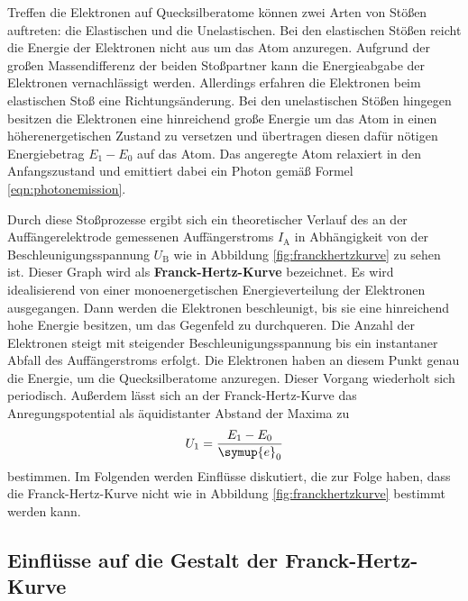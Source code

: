 Treffen die Elektronen auf Quecksilberatome können zwei Arten von Stößen auftreten: die 
Elastischen und die Unelastischen. Bei den elastischen Stößen reicht die Energie der Elektronen
nicht aus um das Atom anzuregen. Aufgrund der großen Massendifferenz der beiden Stoßpartner
kann die Energieabgabe der Elektronen vernachlässigt werden. Allerdings erfahren die Elektronen
beim elastischen Stoß eine Richtungsänderung.
Bei den unelastischen Stößen hingegen besitzen die Elektronen eine hinreichend große 
Energie um das Atom in einen höherenergetischen Zustand zu versetzen und übertragen diesen
dafür nötigen Energiebetrag $E_1-E_0$ auf das Atom. 
Das angeregte Atom relaxiert in den Anfangszustand und emittiert dabei ein Photon gemäß
Formel \eqref{eqn:photonemission}.

Durch diese Stoßprozesse ergibt sich ein theoretischer Verlauf des an der Auffängerelektrode 
gemessenen Auffängerstroms $I_{\mathrm{A}}$ in Abhängigkeit von der Beschleunigungsspannung
$U_{\mathrm{B}}$ wie in Abbildung \ref{fig:franckhertzkurve} zu sehen ist.
Dieser Graph wird als \textbf{Franck-Hertz-Kurve} bezeichnet.
Es wird idealisierend von einer monoenergetischen Energieverteilung der Elektronen ausgegangen.
Dann werden die Elektronen beschleunigt, bis sie eine hinreichend hohe Energie besitzen, um
das Gegenfeld zu durchqueren. Die Anzahl der Elektronen steigt mit steigender 
Beschleunigungsspannung bis ein instantaner Abfall des Auffängerstroms erfolgt. Die Elektronen
haben an diesem Punkt genau die Energie, um die Quecksilberatome anzuregen. Dieser Vorgang 
wiederholt sich periodisch. 
Außerdem lässt sich an der Franck-Hertz-Kurve das Anregungspotential als äquidistanter 
Abstand der Maxima zu
\begin{equation}
	U_1 = \frac{E_1-E_0}{\symup{e}_0} 
\end{equation}
bestimmen.
Im Folgenden werden Einflüsse diskutiert, die zur Folge haben, dass die Franck-Hertz-Kurve nicht
wie in Abbildung \ref{fig:franckhertzkurve} bestimmt werden kann.
\subsection{Einflüsse auf die Gestalt der Franck-Hertz-Kurve}
